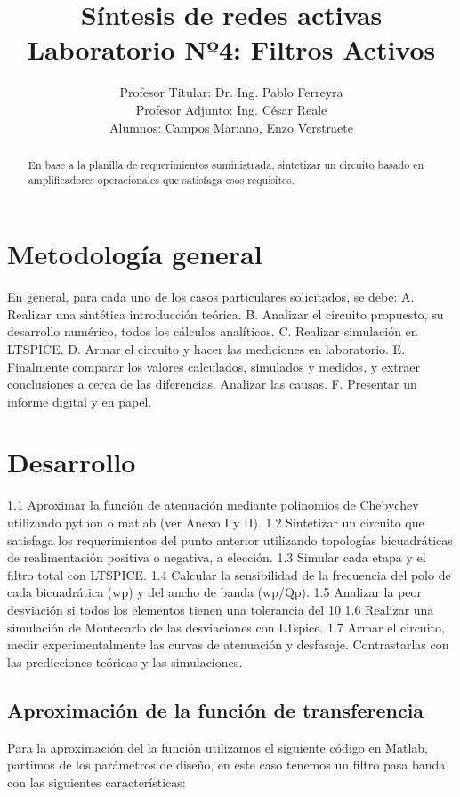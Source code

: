 \documentclass[12pt]{article}
\title{Síntesis de redes activas \\ Laboratorio Nº4: Filtros Activos}
\author{Profesor Titular: Dr. Ing. Pablo Ferreyra \\  Profesor Adjunto: Ing. César Reale \\ Alumnos: Campos Mariano, 
	Enzo Verstraete}
\begin{document}
	\maketitle
	
	\begin{abstract}
		En base a la planilla de requerimientos suministrada, sintetizar un circuito basado en
		amplificadores operacionales que satisfaga esos requisitos.
	\end{abstract}
	
	
	\section{Metodología general}	
	En general, para cada uno de los casos particulares solicitados, se debe:
	A. Realizar una sintética introducción teórica.
	B. Analizar el circuito propuesto, su desarrollo numérico, todos los cálculos analíticos.
	C. Realizar simulación en LTSPICE.
	D. Armar el circuito y hacer las mediciones en laboratorio.
	E. Finalmente comparar los valores calculados, simulados y medidos, y extraer conclusiones a
	cerca de las diferencias. Analizar las causas.
	F. Presentar un informe digital y en papel.
	
	\section{Desarrollo}
	1.1 Aproximar la función de atenuación mediante polinomios de Chebychev utilizando python
	o matlab (ver Anexo I y II).
	1.2 Sintetizar un circuito que satisfaga los requerimientos del punto anterior utilizando topologías
	bicuadráticas de realimentación positiva o negativa, a elección.
	1.3 Simular cada etapa y el filtro total con LTSPICE.
	1.4 Calcular la sensibilidad de la frecuencia del polo de cada bicuadrática (wp) y del ancho de
	banda (wp/Qp).
	1.5 Analizar la peor desviación si todos los elementos tienen una tolerancia del 10 %
	1.6 Realizar una simulación de Montecarlo de las desviaciones con LTspice.
	1.7 Armar el circuito, medir experimentalmente las curvas de atenuación y desfasaje. Contrastarlas
	con las predicciones teóricas y las simulaciones.
	
	\subsection{Aproximación de la función de transferencia}
	Para la aproximación del la función utilizamos el siguiente código en Matlab, partimos de los parámetros de diseño, en este caso tenemos un filtro pasa banda con las siguientes características:
\end{document}
